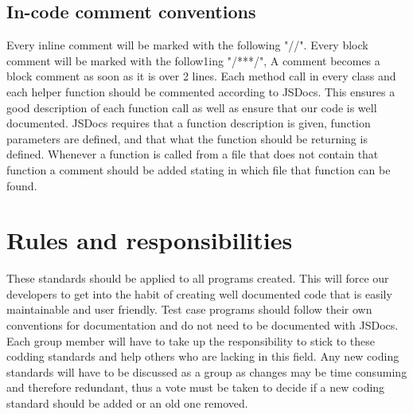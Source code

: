 \documentclass[a4paper]{article}
\begin{document}
\subsection{In-code comment conventions}
Every inline comment will be marked with the following "//". Every block comment will be marked with the follow1ing "/***/", A comment becomes a block comment as soon as it is over 2 lines.
Each method call in every class and each helper function should be commented according to JSDocs. This ensures a good description of each function call as well as ensure that our code is well documented. JSDocs requires that a function description is given, function parameters are defined, and that what the function should be returning is defined.
Whenever a function is called from a file that does not contain that function a comment should be added stating in which file that function can be found.  

\section{Rules and responsibilities}
These standards should be applied to all programs created. This will force our developers to get into the habit of creating well documented code that is easily maintainable and user friendly. Test case programs should follow their own conventions for documentation and do not need to be documented with JSDocs. Each group member will have to take up the responsibility to stick to these codding standards and help others who are lacking in this field. Any new coding standards will have to be discussed as a group as changes may be time consuming and therefore redundant, thus a vote must be taken to decide if a new coding standard should be added or an old one removed.   
\end{document}

